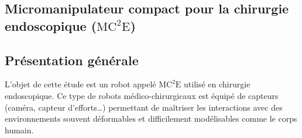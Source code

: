 \documentclass[10pt,fleqn]{article} %
\begin{document}

\vspace{7cm}
\pagestyle{fancy}
\thispagestyle{plain}

\def\columnseprulecolor{\color{ocre}}
\setlength{\columnseprule}{0.4pt} 

\begin{multicols}{2}
\section{Micromanipulateur compact pour la chirurgie endoscopique ($\text{MC}^2\text{E}$)}
\subsection{Présentation générale}
L’objet de cette étude est un robot appelé $\text{MC}^2\text{E}$ utilisé en chirurgie endoscopique. Ce type de
robots médico-chirurgicaux est équipé de capteurs (caméra, capteur d’efforts…) permettant de maîtriser
les interactions avec des environnements souvent déformables et difficilement modélisables comme le
corps humain.
%



\end{multicols}
\end{document}

